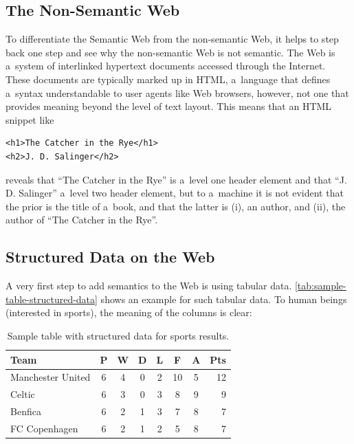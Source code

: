 \subsection{The Non-Semantic Web} \label{sec:non-semantic-web}
To differentiate the Semantic Web from the non-semantic Web, it helps to step back one step and
see why the non-semantic Web is not semantic.
The Web is a~system of interlinked hypertext documents accessed through the Internet.
These documents are typically marked up in HTML, a~language that defines a~syntax
understandable to user agents like Web browsers, however,
not one that provides meaning beyond the level of text layout.
This means that an HTML snippet like
\begin{verbatim}
<h1>The Catcher in the Rye</h1>
<h2>J. D. Salinger</h2>
\end{verbatim}
reveals that ``The Catcher in the Rye'' is a~level one header element and
that ``J. D. Salinger'' a~level two header element,
but to a~machine it is not evident that the prior is the title of a~book,
and that the latter is (i), an author, and (ii), the author of ``The Catcher in the Rye''.

\subsection{Structured Data on the Web}
A very first step to add semantics to the Web is using tabular data.
\autoref{tab:sample-table-structured-data} shows an example for such tabular data.
To human beings (interested in sports), the meaning of the columns is clear:

\begin{table}[b]
 \begin{center}
  \begin{tabular}{l*{6}{c}r}
Team              & P & W & D & L & F  & A & Pts \\
\hline
Manchester United & 6 & 4 & 0 & 2 & 10 & 5 & 12  \\
Celtic            & 6 & 3 & 0 & 3 &  8 & 9 &  9  \\
Benfica           & 6 & 2 & 1 & 3 &  7 & 8 &  7  \\
FC Copenhagen     & 6 & 2 & 1 & 2 &  5 & 8 &  7  \\
  \end{tabular}
\caption{Sample table with structured data for sports results.}
\label{tab:sample-table-structured-data}
 \end{center}
\end{table}

